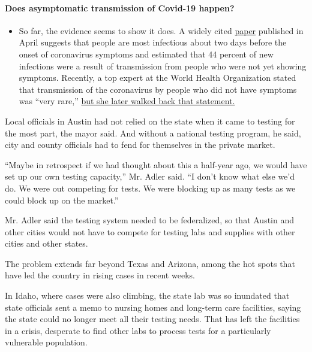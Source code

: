 \begin{itemize}
{  \paragraph{Does asymptomatic transmission of Covid-19
  happen?}\label{does-asymptomatic-transmission-of-covid-19-happen}}

  \begin{itemize}
  \tightlist
  \item
    So far, the evidence seems to show it does. A widely cited
    \href{https://www.nature.com/articles/s41591-020-0869-5}{paper}
    published in April suggests that people are most infectious about
    two days before the onset of coronavirus symptoms and estimated that
    44 percent of new infections were a result of transmission from
    people who were not yet showing symptoms. Recently, a top expert at
    the World Health Organization stated that transmission of the
    coronavirus by people who did not have symptoms was ``very rare,''
    \href{https://www.nytimes.com/2020/06/09/world/coronavirus-updates.html?action=click\&pgtype=Article\&state=default\&region=MAIN_CONTENT_3\&context=storylines_faq\#link-1f302e21}{but
    she later walked back that statement.}
  \end{itemize}
\end{itemize}

Local officials in Austin had not relied on the state when it came to
testing for the most part, the mayor said. And without a national
testing program, he said, city and county officials had to fend for
themselves in the private market.

``Maybe in retrospect if we had thought about this a half-year ago, we
would have set up our own testing capacity,'' Mr. Adler said. ``I don't
know what else we'd do. We were out competing for tests. We were
blocking up as many tests as we could block up on the market.''

Mr. Adler said the testing system needed to be federalized, so that
Austin and other cities would not have to compete for testing labs and
supplies with other cities and other states.

The problem extends far beyond Texas and Arizona, among the hot spots
that have led the country in rising cases in recent weeks.

In Idaho, where cases were also climbing, the state lab was so inundated
that state officials sent a memo to nursing homes and long-term care
facilities, saying the state could no longer meet all their testing
needs. That has left the facilities in a crisis, desperate to find other
labs to process tests for a particularly vulnerable population.

